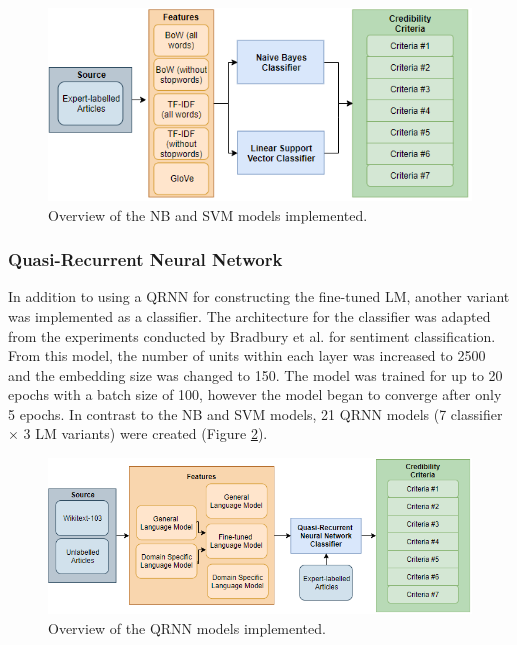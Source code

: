 \documentclass[a4paper,twoside,phd]{BYUPhys}
\begin{document}
\begin{figure}[H]
	\centering
	\includegraphics[totalheight=6cm]{images/ml-models.png}
	\caption{Overview of the NB and SVM models implemented.}
	\label{fig:MLModels}
\end{figure}

\subsubsection{Quasi-Recurrent Neural Network}
\label{sec:ModelQRNN}

In addition to using a QRNN for constructing the fine-tuned LM, another variant was implemented as a classifier. The architecture for the classifier was adapted from the experiments conducted by Bradbury et al. \cite{bradbury2016quasi} for sentiment classification. From this model, the number of units within each layer was increased to 2500 and the embedding size was changed to 150. The model was trained for up to 20 epochs with a batch size of 100, however the model began to converge after only 5 epochs. In contrast to the NB and SVM models, 21 QRNN models (7 classifier $\times$ 3 LM variants) were created (Figure \ref{fig:DLModels}).

\begin{figure}[H]
	\centering
	\includegraphics[totalheight=5.6cm]{images/dl-models.png}
	\caption{Overview of the QRNN models implemented.}
	\label{fig:DLModels}
\end{figure}
\end{document}
